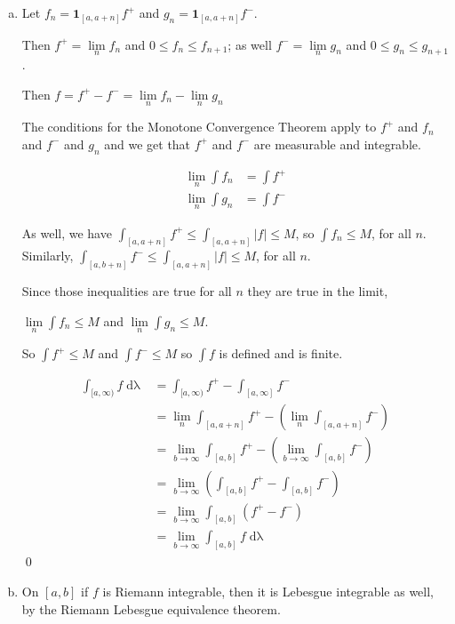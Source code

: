 \documentclass[11pt,oneside]{article}
\numberwithin{equation}{section}
\theoremstyle{definition}
\def\limn{\lim \limits _n}
\def\one{\mathbf{1}}
\begin{document}
\begin{solution}
\begin{enumerate}[(a)]
\item
  Let $f_n = \one _ { [a, a+n]} f^+$ and $g_n = \one_ { [a, a+n]} f^-$.

  Then $f^+ = \limn f_n$ and $0 \leq f_n \leq f_{n+1}$; as well $f^- = \limn g_n$ and $0 \leq g_n \leq g_{n+1}$. 

  Then $f = f^+ - f^- = \limn f_n - \limn g_n$

  The conditions for the Monotone Convergence Theorem apply to $f^+$
  and $f_n$ and $f^-$ and $g_n$ and we get that $f^+$ and $f^-$ are
  measurable and integrable.

  \begin{align*}
    \limn \int f_n &= \int f^+ \\
    \limn \int g_n  &= \int f^-
  \end{align*}

  As well, we have $\int _ { [a, a +n]} f^+ \leq \int _ { [a, a+n] } |f| \leq M$,
  so $\int f_n \leq M$, for all $n$.  Similarly, $\int_ {[a, b+n]} f^- \leq \int_ { [a, a+n]} |f| \leq M$, for all $n$.

  Since those inequalities are true for all $n$ they are true in the limit,

  $\limn \int f_n \leq M$ and $\limn \int g_n \leq M$.  
  
  So $\int f^+ \leq M$ and $\int f^- \leq M$ so $\int f$ is defined and
  is finite.

  \begin{align*}
  \int _ { [a, \infty) } f \mathop{d \lambda} &= \int _ { [a, \infty) } f^+ - \int_{[a, \infty]} f^- \\
      &= \limn \int _ { [a, a + n ] } f^+ - ( \limn \int_{[a, a + n ]} f^- ) \\
      &= \lim _ { b \to \infty }  \int _ {[a, b]} f^+ - ( \lim  _ { b \to \infty } \int_{[a, b]} f^- )\\
      &= \lim _ { b \to \infty }  \left( \int _ {[a, b]} f^+ -  \int_{[a, b]} f^-  \right) \\
      &= \lim _ { b \to \infty }  \int_{[a, b]} \left( f^+ -   f^-  \right) \\
      &= \lim _ { b \to \infty }  \int_{[a, b]} f \mathop{d \lambda}
  \end{align*}
  \qed

\item
  On $[a, b]$ if $f$ is Riemann integrable, then it is Lebesgue
  integrable as well, by the Riemann Lebesgue equivalence theorem.  


\end{enumerate}
\end{solution}
\end{document}
